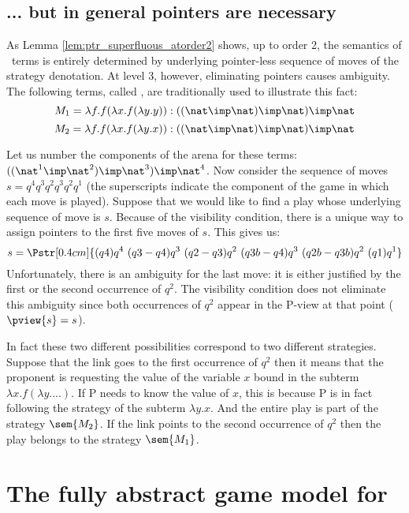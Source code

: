 \subsection{... but in general pointers are necessary}
\label{subsec:pointer_necessary}

As Lemma \ref{lem:ptr_superfluous_atorder2} shows, up to order 2,
the semantics of \pcf\ terms is entirely determined by underlying
pointer-less sequence of moves of the strategy denotation. At level
3, however, eliminating pointers causes ambiguity. The following
terms, called \emph{}, are traditionally used
to illustrate this fact:
$$M_1 = \lambda f . f (\lambda x . f (\lambda y .y )) : ((\nat \imp \nat) \imp \nat) \imp \nat$$
$$M_2 = \lambda f . f (\lambda x . f (\lambda y .x )) : ((\nat \imp \nat) \imp \nat) \imp \nat$$

Let us number the components of the arena for these terms: $((\nat^1
\imp \nat^2) \imp \nat^3) \imp \nat^4$.  Now consider the sequence
of moves $s = q^4 q^3 q^2 q^3 q^2 q^1$ (the superscripts indicate
the component of the game in which each move is played). Suppose
that we would like to find a play whose underlying sequence of move
is $s$. Because of the visibility condition, there is a unique way
to assign pointers to the first five moves of $s$. This gives us:
$$s = \Pstr[0.4cm]{ (q4){q^4}\ (q3-q4){q^3}\ (q2-q3){q^2}\
(q3b-q4){q^3}\ (q2b-q3b){q^2}\ (q1){q^1} }$$ Unfortunately, there is
an ambiguity for the last move: it is either justified by the first
or the second occurrence of $q^2$. The visibility condition does not
eliminate this ambiguity since both occurrences of $q^2$ appear in
the P-view at that point ($\pview{s} = s$).

In fact these two different possibilities correspond to two
different strategies. Suppose that the link goes to the first
occurrence of $q^2$ then it means that the proponent is requesting
the value of the variable $x$ bound in the subterm $\lambda x . f (
\lambda y. ... )$. If P needs to know the value of $x$, this is
because P is in fact following the strategy of the subterm $\lambda
y . x$. And the entire play is part of the strategy $\sem{M_2}$.
If the link points to the second occurrence of $q^2$ then
the play belongs to the strategy $\sem{M_1}$.

\section{The fully abstract game model for \pcf}

